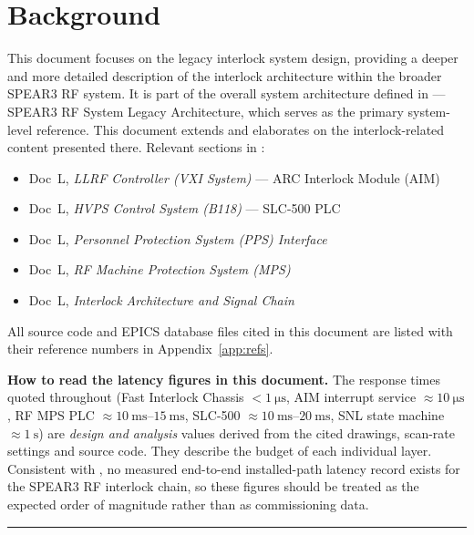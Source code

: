 \section*{Background}\label{sec:background}


This document focuses on the legacy interlock system design, providing a deeper and more detailed description of the interlock architecture within the broader SPEAR3 RF system. It is part of the overall system architecture defined in  --- SPEAR3 RF System Legacy Architecture, which serves as the primary system-level reference. This document extends and elaborates on the interlock-related content presented there. Relevant sections in :

\begin{itemize}
\tightlist
\item
  Doc~L, \emph{LLRF Controller (VXI System)} --- ARC Interlock Module (AIM)
\item
  Doc~L, \emph{HVPS Control System (B118)} --- SLC-500 PLC
\item
  Doc~L, \emph{Personnel Protection System (PPS) Interface}
\item
  Doc~L, \emph{RF Machine Protection System (MPS)}
\item
  Doc~L, \emph{Interlock Architecture and Signal Chain}
\end{itemize}

All source code and EPICS database files cited in this document are listed with their reference numbers in Appendix~\ref*{app:refs}.

\begin{keynote}
\textbf{How to read the latency figures in this document.} The response times quoted throughout
(Fast Interlock Chassis $<\qty{1}{\micro\second}$, AIM interrupt service $\approx\qty{10}{\micro\second}$,
RF MPS PLC $\approx\qtyrange{10}{15}{\milli\second}$, SLC-500 $\approx\qtyrange{10}{20}{\milli\second}$,
SNL state machine $\approx\qty{1}{\second}$) are \emph{design and analysis} values derived from the
cited drawings, scan-rate settings and source code. They describe the budget of each individual
layer. Consistent with , no measured end-to-end installed-path latency record exists for the
SPEAR3 RF interlock chain, so these figures should be treated as the expected order of magnitude
rather than as commissioning data.
\end{keynote}

\begin{center}\rule{0.5\linewidth}{0.5pt}\end{center}

